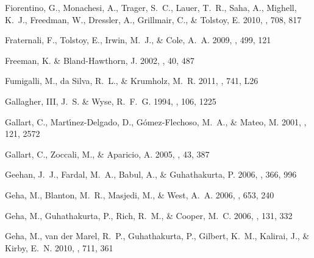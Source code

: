\documentclass[manuscript]{aastex}
\begin{document}
\begin{thebibliography}{381}
{Fiorentino}, G., {Monachesi}, A., {Trager}, S.~C., {Lauer}, T.~R., {Saha}, A.,
  {Mighell}, K.~J., {Freedman}, W., {Dressler}, A., {Grillmair}, C., \&
  {Tolstoy}, E. 2010, \apj, 708, 817

{Fraternali}, F., {Tolstoy}, E., {Irwin}, M.~J., \& {Cole}, A.~A. 2009, \aap,
  499, 121

{Freeman}, K. \& {Bland-Hawthorn}, J. 2002, \araa, 40, 487

{Fumigalli}, M., {da Silva}, R.~L., \& {Krumholz}, M.~R. 2011, \apjl, 741, L26

{Gallagher}, III, J.~S. \& {Wyse}, R.~F.~G. 1994, \pasp, 106, 1225

{Gallart}, C., {Mart{\'{\i}}nez-Delgado}, D., {G{\'o}mez-Flechoso}, M.~A., \&
  {Mateo}, M. 2001, \aj, 121, 2572

{Gallart}, C., {Zoccali}, M., \& {Aparicio}, A. 2005, \araa, 43, 387

{Geehan}, J.~J., {Fardal}, M.~A., {Babul}, A., \& {Guhathakurta}, P. 2006,
  \mnras, 366, 996

{Geha}, M., {Blanton}, M.~R., {Masjedi}, M., \& {West}, A.~A.
  2006{}, \apj, 653, 240

{Geha}, M., {Guhathakurta}, P., {Rich}, R.~M., \& {Cooper}, M.~C.
  2006{}, \aj, 131, 332

{Geha}, M., {van der Marel}, R.~P., {Guhathakurta}, P., {Gilbert}, K.~M.,
  {Kalirai}, J., \& {Kirby}, E.~N. 2010, \apj, 711, 361


\end{thebibliography}
\end{document}
